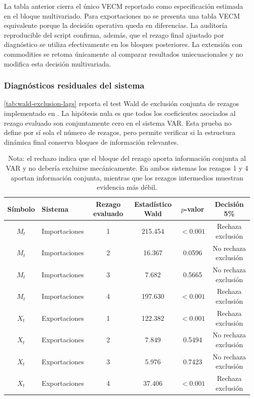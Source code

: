 \documentclass[11pt,a4paper]{article}
\begin{document}
	La tabla anterior cierra el único VECM reportado como especificación estimada
	en el bloque multivariado. Para exportaciones no se presenta una tabla VECM
	equivalente porque la decisión operativa queda en diferencias. La auditoría
	reproducible del script confirma, además, que el rezago final ajustado por
	diagnóstico se utiliza efectivamente en los bloques posteriores. La extensión
	con commodities se retoma únicamente al comparar resultados uniecuacionales y
	no modifica esta decisión multivariada.
	
	\subsubsection{Diagnósticos residuales del sistema}
	\label{subsubsec:diagnosticos-residuales-var}
	
	\autoref{tab:wald-exclusion-lags} reporta el test Wald de exclusión conjunta de
	rezagos implementado en . La hipótesis nula
	es que todos los coeficientes asociados al rezago evaluado son conjuntamente
	cero en el sistema VAR. Esta prueba no define por sí sola el número de rezagos,
	pero permite verificar si la estructura dinámica final conserva bloques de
	información relevantes.
	
	\begin{table}[H]
		\centering
		\caption{Test Wald de exclusión conjunta de rezagos VAR.}
		\label{tab:wald-exclusion-lags}
		\small
		\begin{tabular}{clcccc}
			\toprule
			Símbolo & Sistema & Rezago evaluado & Estadístico Wald & \(p\)-valor & Decisión 5\% \\
			\midrule
			\(M_t\) & Importaciones & 1 & 215.454 & \(<0.001\) & Rechaza exclusión \\
			\(M_t\) & Importaciones & 2 & 16.367 & 0.0596 & No rechaza exclusión \\
			\(M_t\) & Importaciones & 3 & 7.682 & 0.5665 & No rechaza exclusión \\
			\(M_t\) & Importaciones & 4 & 197.630 & \(<0.001\) & Rechaza exclusión \\
			\(X_t\) & Exportaciones & 1 & 122.382 & \(<0.001\) & Rechaza exclusión \\
			\(X_t\) & Exportaciones & 2 & 7.849 & 0.5494 & No rechaza exclusión \\
			\(X_t\) & Exportaciones & 3 & 5.976 & 0.7423 & No rechaza exclusión \\
			\(X_t\) & Exportaciones & 4 & 37.406 & \(<0.001\) & Rechaza exclusión \\
			\bottomrule
		\end{tabular}
		\caption*{\footnotesize Nota: el rechazo indica que el bloque del rezago aporta
			información conjunta al VAR y no debería excluirse mecánicamente. En ambos
			sistemas los rezagos 1 y 4 aportan información conjunta, mientras que los
			rezagos intermedios muestran evidencia más débil.}
	\end{table}
	
\end{document}
